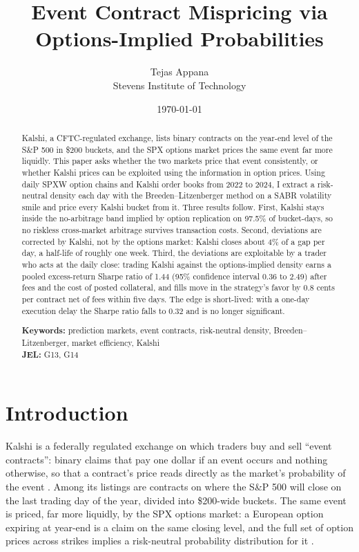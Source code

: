 \documentclass{article}
\title{Event Contract Mispricing via Options-Implied Probabilities}
\author{Tejas Appana\\ \small Stevens Institute of Technology}
\date{\today}
\begin{document}
\maketitle

\begin{abstract}
\noindent Kalshi, a CFTC-regulated exchange, lists binary contracts on the year-end level of the S\&P 500 in \$200 buckets, and the SPX options market prices the same event far more liquidly. This paper asks whether the two markets price that event consistently, or whether Kalshi prices can be exploited using the information in option prices. Using daily SPXW option chains and Kalshi order books from 2022 to 2024, I extract a risk-neutral density each day with the Breeden--Litzenberger method on a SABR volatility smile and price every Kalshi bucket from it. Three results follow. First, Kalshi stays inside the no-arbitrage band implied by option replication on 97.5\% of bucket-days, so no riskless cross-market arbitrage survives transaction costs. Second, deviations are corrected by Kalshi, not by the options market: Kalshi closes about 4\% of a gap per day, a half-life of roughly one week. Third, the deviations are exploitable by a trader who acts at the daily close: trading Kalshi against the options-implied density earns a pooled excess-return Sharpe ratio of 1.44 (95\% confidence interval 0.36 to 2.49) after fees and the cost of posted collateral, and fills move in the strategy's favor by 0.8 cents per contract net of fees within five days. The edge is short-lived: with a one-day execution delay the Sharpe ratio falls to 0.32 and is no longer significant.

\medskip
\noindent\textbf{Keywords:} prediction markets, event contracts, risk-neutral density, Breeden--Litzenberger, market efficiency, Kalshi\\
\textbf{JEL:} G13, G14
\end{abstract}


\section{Introduction}\label{sec:intro}
Kalshi is a federally regulated exchange on which traders buy and sell ``event contracts'': binary claims that pay one dollar if an event occurs and nothing otherwise, so that a contract's price reads directly as the market's probability of the event \cite{Wolfers2004}. Among its listings are contracts on where the S\&P 500 will close on the last trading day of the year, divided into \$200-wide buckets. The same event is priced, far more liquidly, by the SPX options market: a European option expiring at year-end is a claim on the same closing level, and the full set of option prices across strikes implies a risk-neutral probability distribution for it \cite{Breeden1978}.
\end{document}
